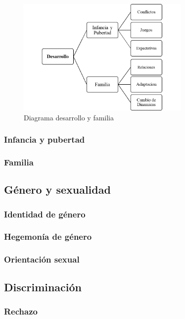 \begin{figure}
    \centering
    \includegraphics[width=0.75\textwidth]{desarrollo}
    \caption{Diagrama desarrollo y familia}\label{fig:desarrollo}
\end{figure}

\subsubsection{Infancia y pubertad}

\subsubsection{Familia}

\subsection{Género y sexualidad}

\subsubsection{Identidad de género}

\subsubsection{Hegemonía de género}

\subsubsection{Orientación sexual}

\subsection{Discriminación}

\subsubsection{Rechazo}

